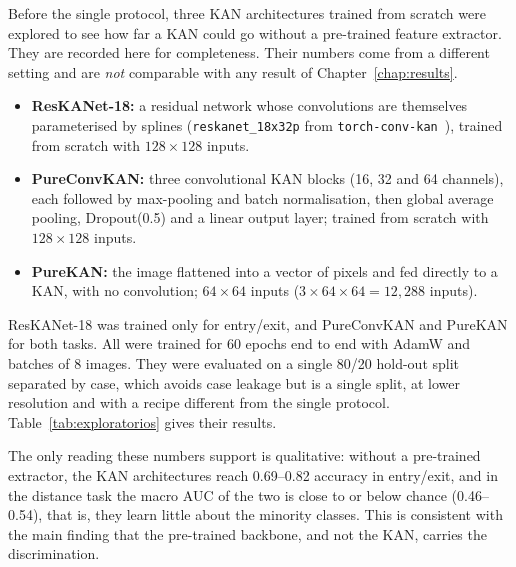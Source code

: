 \label{chap:apendice_exploratorios}

Before the single protocol, three KAN architectures trained from scratch were explored to see how far a KAN could go without a pre-trained feature extractor. They are recorded here for completeness. Their numbers come from a different setting and are \emph{not} comparable with any result of Chapter~\ref{chap:results}.

\begin{itemize}
    \item \textbf{ResKANet-18:} a residual network whose convolutions are themselves parameterised by splines (\texttt{reskanet\_18x32p} from \texttt{torch-conv-kan}~\cite{drokin2024torchconvkan}), trained from scratch with $128 \times 128$ inputs.
    \item \textbf{PureConvKAN:} three convolutional KAN blocks (16, 32 and 64 channels), each followed by max-pooling and batch normalisation, then global average pooling, Dropout(0.5) and a linear output layer; trained from scratch with $128 \times 128$ inputs.
    \item \textbf{PureKAN:} the image flattened into a vector of pixels and fed directly to a KAN, with no convolution; $64 \times 64$ inputs ($3 \times 64 \times 64 = 12{,}288$ inputs).
\end{itemize}

ResKANet-18 was trained only for entry/exit, and PureConvKAN and PureKAN for both tasks. All were trained for 60 epochs end to end with AdamW and batches of 8 images. They were evaluated on a single 80/20 hold-out split separated by case, which avoids case leakage but is a single split, at lower resolution and with a recipe different from the single protocol. Table~\ref{tab:exploratorios} gives their results.



The only reading these numbers support is qualitative: without a pre-trained extractor, the KAN architectures reach 0.69--0.82 accuracy in entry/exit, and in the distance task the macro AUC of the two is close to or below chance (0.46--0.54), that is, they learn little about the minority classes. This is consistent with the main finding that the pre-trained backbone, and not the KAN, carries the discrimination.
